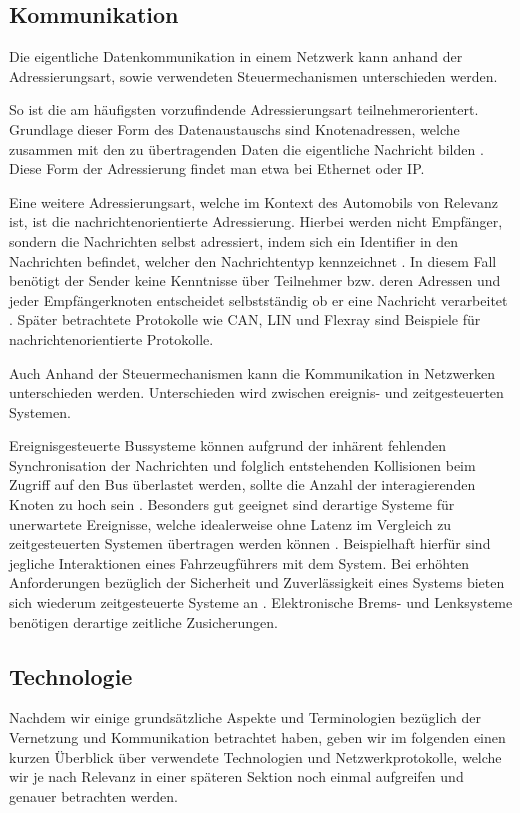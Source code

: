     \subsection{Kommunikation}
    Die eigentliche Datenkommunikation in einem Netzwerk kann anhand der Adressierungsart, sowie verwendeten Steuermechanismen unterschieden werden. 

    So ist die am häufigsten vorzufindende Adressierungsart teilnehmerorientert. Grundlage dieser Form des Datenaustauschs sind Knotenadressen, welche zusammen mit den
    zu übertragenden Daten die eigentliche Nachricht bilden \cite{reif2011bosch}. Diese Form der Adressierung findet man etwa bei Ethernet oder IP. 

    Eine weitere Adressierungsart, welche im Kontext des Automobils von Relevanz ist, ist die nachrichtenorientierte Adressierung. Hierbei werden nicht Empfänger, sondern die Nachrichten selbst
    adressiert, indem sich ein Identifier in den Nachrichten befindet, welcher den Nachrichtentyp kennzeichnet \cite{reif2011bosch}. In diesem Fall benötigt der Sender keine 
    Kenntnisse über Teilnehmer bzw. deren Adressen und jeder Empfängerknoten entscheidet selbstständig ob er eine Nachricht verarbeitet \cite{reif2011bosch}. Später betrachtete
    Protokolle wie CAN, LIN und Flexray sind Beispiele für nachrichtenorientierte Protokolle.

    Auch Anhand der Steuermechanismen kann die Kommunikation in Netzwerken unterschieden werden. Unterschieden wird zwischen ereignis- und zeitgesteuerten Systemen.

    Ereignisgesteuerte Bussysteme können aufgrund der inhärent fehlenden Synchronisation der Nachrichten und folglich entstehenden Kollisionen beim Zugriff auf den Bus
    überlastet werden, sollte die Anzahl der interagierenden Knoten zu hoch sein \cite{reif2011bosch}. Besonders gut geeignet sind derartige Systeme für unerwartete Ereignisse,
    welche idealerweise ohne Latenz im Vergleich zu zeitgesteuerten Systemen übertragen werden können \cite{reif2011bosch}. Beispielhaft hierfür sind jegliche Interaktionen eines 
    Fahrzeugführers mit dem System. Bei erhöhten Anforderungen bezüglich der Sicherheit und Zuverlässigkeit eines Systems bieten sich wiederum zeitgesteuerte Systeme an \cite{reif2011bosch}.
    Elektronische Brems- und Lenksysteme benötigen derartige zeitliche Zusicherungen.
    \subsection{Technologie}
    Nachdem wir einige grundsätzliche Aspekte und Terminologien bezüglich der Vernetzung und Kommunikation betrachtet haben, geben wir im folgenden einen kurzen Überblick
    über verwendete Technologien und Netzwerkprotokolle, welche wir je nach Relevanz in einer späteren Sektion noch einmal aufgreifen und genauer betrachten werden.
